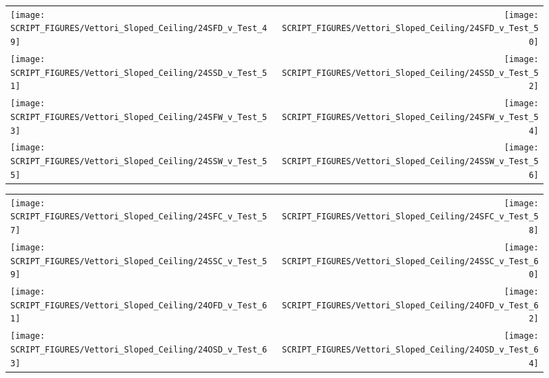 \begin{figure}[!ht]
\begin{tabular*}{\textwidth}{l@{\extracolsep{\fill}}r}
\texttt{[image: SCRIPT\_FIGURES/Vettori\_Sloped\_Ceiling/24SFD\_v\_Test\_49]} &
\texttt{[image: SCRIPT\_FIGURES/Vettori\_Sloped\_Ceiling/24SFD\_v\_Test\_50]} \\
\texttt{[image: SCRIPT\_FIGURES/Vettori\_Sloped\_Ceiling/24SSD\_v\_Test\_51]} &
\texttt{[image: SCRIPT\_FIGURES/Vettori\_Sloped\_Ceiling/24SSD\_v\_Test\_52]} \\
\texttt{[image: SCRIPT\_FIGURES/Vettori\_Sloped\_Ceiling/24SFW\_v\_Test\_53]} &
\texttt{[image: SCRIPT\_FIGURES/Vettori\_Sloped\_Ceiling/24SFW\_v\_Test\_54]} \\
\texttt{[image: SCRIPT\_FIGURES/Vettori\_Sloped\_Ceiling/24SSW\_v\_Test\_55]} &
\texttt{[image: SCRIPT\_FIGURES/Vettori\_Sloped\_Ceiling/24SSW\_v\_Test\_56]} \\
\end{tabular*}
\label{Vettori_Sloped_7}
\end{figure}

\begin{figure}[!ht]
\begin{tabular*}{\textwidth}{l@{\extracolsep{\fill}}r}
\texttt{[image: SCRIPT\_FIGURES/Vettori\_Sloped\_Ceiling/24SFC\_v\_Test\_57]} &
\texttt{[image: SCRIPT\_FIGURES/Vettori\_Sloped\_Ceiling/24SFC\_v\_Test\_58]} \\
\texttt{[image: SCRIPT\_FIGURES/Vettori\_Sloped\_Ceiling/24SSC\_v\_Test\_59]} &
\texttt{[image: SCRIPT\_FIGURES/Vettori\_Sloped\_Ceiling/24SSC\_v\_Test\_60]} \\
\texttt{[image: SCRIPT\_FIGURES/Vettori\_Sloped\_Ceiling/24OFD\_v\_Test\_61]} &
\texttt{[image: SCRIPT\_FIGURES/Vettori\_Sloped\_Ceiling/24OFD\_v\_Test\_62]} \\
\texttt{[image: SCRIPT\_FIGURES/Vettori\_Sloped\_Ceiling/24OSD\_v\_Test\_63]} &
\texttt{[image: SCRIPT\_FIGURES/Vettori\_Sloped\_Ceiling/24OSD\_v\_Test\_64]} \\
\end{tabular*}
\label{Vettori_Sloped_8}
\end{figure}

